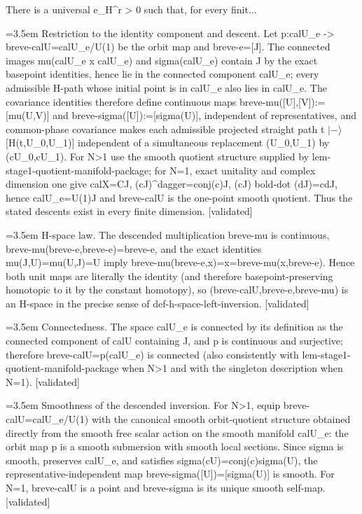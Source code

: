 \documentclass{article}
\newcommand{\step}[1]{\par\noindent\hangindent=3.5em\hangafter=1%
  \makebox[3.5em][l]{\textbf{#1.}}}
\newcommand{\steptag}[1]{\hfill{\small\textsf{[#1]}}}
\begin{document}
\begin{proofbox}{There is a universal e\_H\textasciicircum{}r > 0 such that, for every finit...}
\step{1.3} Restriction to the identity component and descent. Let p:calU\_e -> breve-calU=calU\_e/U(1) be the orbit map and breve-e=[J]. The connected images mu(calU\_e x calU\_e) and sigma(calU\_e) contain J by the exact basepoint identities, hence lie in the connected component calU\_e; every admissible H-path whose initial point is in calU\_e also lies in calU\_e. The covariance identities therefore define continuous maps breve-mu([U],[V]):=[mu(U,V)] and breve-sigma([U]):=[sigma(U)], independent of representatives, and common-phase covariance makes each admissible projected straight path t $|-\rangle$ [H(t,U\_0,U\_1)] independent of a simultaneous replacement (U\_0,U\_1) by (cU\_0,cU\_1). For N>1 use the smooth quotient structure supplied by lem-stage1-quotient-manifold-package; for N=1, exact unitality and complex dimension one give calX=CJ, (cJ)\textasciicircum{}dagger=conj(c)J, (cJ) bold-dot (dJ)=cdJ, hence calU\_e=U(1)J and breve-calU is the one-point smooth quotient. Thus the stated descents exist in every finite dimension. \steptag{validated} \\[4pt]
\step{1.4} H-space law. The descended multiplication breve-mu is continuous, breve-mu(breve-e,breve-e)=breve-e, and the exact identities mu(J,U)=mu(U,J)=U imply breve-mu(breve-e,x)=x=breve-mu(x,breve-e). Hence both unit maps are literally the identity (and therefore basepoint-preserving homotopic to it by the constant homotopy), so (breve-calU,breve-e,breve-mu) is an H-space in the precise sense of def-h-space-left-inversion. \steptag{validated} \\[4pt]
\step{1.5} Connectedness. The space calU\_e is connected by its definition as the connected component of calU containing J, and p is continuous and surjective; therefore breve-calU=p(calU\_e) is connected (also consistently with lem-stage1-quotient-manifold-package when N>1 and with the singleton description when N=1). \steptag{validated} \\[4pt]
\step{1.6} Smoothness of the descended inversion. For N>1, equip breve-calU=calU\_e/U(1) with the canonical smooth orbit-quotient structure obtained directly from the smooth free scalar action on the smooth manifold calU\_e: the orbit map p is a smooth submersion with smooth local sections. Since sigma is smooth, preserves calU\_e, and satisfies sigma(cU)=conj(c)sigma(U), the representative-independent map breve-sigma([U])=[sigma(U)] is smooth. For N=1, breve-calU is a point and breve-sigma is its unique smooth self-map. \steptag{validated} \\[6pt]

\end{proofbox}
\end{document}
